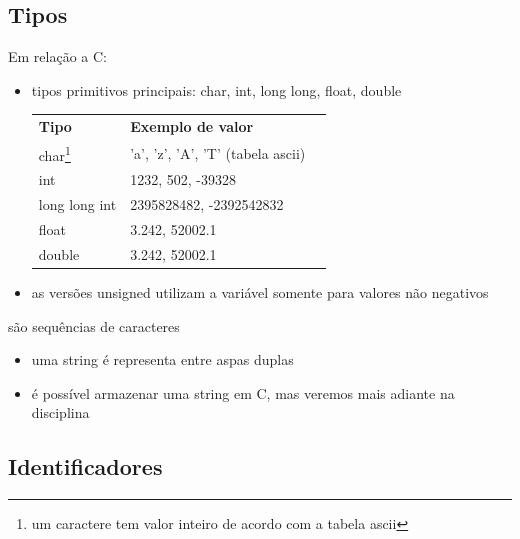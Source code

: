 \documentclass[portuguese,10pt,xcolor=table]{beamer}
\begin{document}
\subsection{Tipos}
	\begin{frame}
		Em relação a C:
		\begin{itemize}
			\item tipos primitivos principais: char, int, long long, float, double
				\begin{table}[]
					\centering
					\begin{tabular}{lll}
						\textbf{Tipo} & \textbf{Exemplo de valor}\\
						char\footnote{um caractere tem valor inteiro de acordo com a tabela ascii} & 'a', 'z', 'A', 'T' (tabela ascii)\\
							int  & 1232, 502, -39328\\
							   long long int   & 2395828482, -2392542832\\
							   float & 3.242, 52002.1 \\
							   double & 3.242, 52002.1
					\end{tabular}
				\end{table}
			\item as versões unsigned utilizam a variável somente para valores não negativos
		\end{itemize}
	\end{frame}
	
	\begin{frame}
		 são sequências de caracteres
		\begin{itemize}
			\item uma string é representa entre aspas duplas
	        
			\item é possível armazenar uma string em C, mas veremos mais adiante na disciplina
		\end{itemize}
	\end{frame}
	
	
\subsection{Identificadores}
\end{document}
